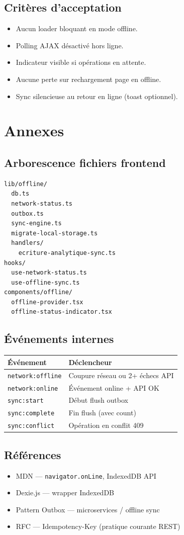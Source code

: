 \documentclass[12pt,a4paper]{report}
\begin{document}
\section{Critères d'acceptation}

\begin{itemize}
  \item Aucun loader bloquant en mode offline.
  \item Polling AJAX désactivé hors ligne.
  \item Indicateur visible si opérations en attente.
  \item Aucune perte sur rechargement page en offline.
  \item Sync silencieuse au retour en ligne (toast optionnel).
\end{itemize}

\chapter{Annexes}

\section{Arborescence fichiers frontend}

\begin{verbatim}
lib/offline/
  db.ts
  network-status.ts
  outbox.ts
  sync-engine.ts
  migrate-local-storage.ts
  handlers/
    ecriture-analytique-sync.ts
hooks/
  use-network-status.ts
  use-offline-sync.ts
components/offline/
  offline-provider.tsx
  offline-status-indicator.tsx
\end{verbatim}

\section{Événements internes}

\begin{longtable}{@{}p{4cm}p{8cm}@{}}
\hline
\textbf{Événement} & \textbf{Déclencheur} \\
\hline

\texttt{network:offline} & Coupure réseau ou 2+ échecs API \\
\texttt{network:online} & Événement online + API OK \\
\texttt{sync:start} & Début flush outbox \\
\texttt{sync:complete} & Fin flush (avec count) \\
\texttt{sync:conflict} & Opération en conflit 409 \\
\hline
\end{longtable}

\section{Références}

\begin{itemize}
  \item MDN — \texttt{navigator.onLine}, IndexedDB API
  \item Dexie.js — wrapper IndexedDB
  \item Pattern Outbox — microservices / offline sync
  \item RFC — Idempotency-Key (pratique courante REST)
\end{itemize}
\end{document}
